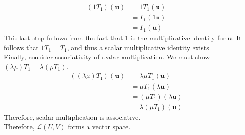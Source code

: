 \documentclass[12pt, letterpaper]{article}
\begin{document}
\begin{solution}
    \begin{align*}
        (1T_1)(\mathbf{u})&=1T_1(\mathbf{u})\\
        &=T_1(1\mathbf{u})\\
        &=T_1(\mathbf{u})
    \end{align*}
    This last step follows from the fact that 1 is the multiplicative identity for \(\mathbf{u}\). It follows that \(1T_1 = T_1\), and thus a scalar multiplicative identity exists.\\
    Finally, consider associativity of scalar multiplication. We must show \((\lambda \mu )T_1 =\lambda (\mu T_1)\).
    \begin{align*}
        ((\lambda \mu )T_1)(\mathbf{u})&=\lambda \mu T_1(\mathbf{u})\\
        &=\mu T_1(\lambda \mathbf{u})\\
        &=(\mu T_1)(\lambda \mathbf{u})\\
        &=\lambda (\mu T_1)(\mathbf{u})
    \end{align*}
    Therefore, scalar multiplication is associative.\\
    Therefore, \(\mathcal{L} (U,V)\) forms a vector space.
\end{solution}
\end{document}
